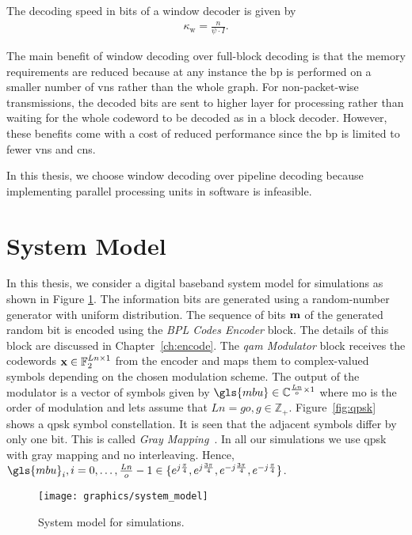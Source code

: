 The decoding speed in bits of a window decoder is given by
\begin{align}
\kappa_{\text{w}}=\frac{n}{\psi\cdot I}.
\end{align}

The main benefit of window decoding over full-block decoding is that the memory requirements are reduced because at any instance the \gls{bp} is performed on a smaller number of \glspl{vn} rather than the whole graph. For non-packet-wise transmissions, the decoded bits are sent to higher layer for processing rather than waiting for the whole codeword to be decoded as in a block decoder. However, these benefits come with a cost of reduced performance since the \gls{bp} is limited to fewer \glspl{vn} and \glspl{cn}.

In this thesis, we choose window decoding over pipeline decoding because implementing parallel processing units in software is infeasible.

\section{System Model}\label{sec:sys_mod}
In this thesis, we consider a digital baseband system model for simulations as shown in Figure \ref{fig:system}. The information bits are generated using a random-number generator with uniform distribution. The sequence of bits $\mathbf{m}$ of the generated random bit is encoded using the \emph{BPL Codes Encoder} block. The details of this block are discussed in Chapter~\ref{ch:encode}. The \emph{\gls{qam} Modulator} block receives the codewords $\mathbf{x}\in\mathbb{F}_2^{Ln\times 1}$ from the encoder and maps them to complex-valued symbols depending on the chosen modulation scheme. The output of the modulator is a vector of symbols given by $\gls{mbu}\in\mathbb{C}^{\frac{Ln}{o}\times 1}$ where \gls{mo} is the order of modulation and lets assume that $Ln=go, g\in\mathbb{Z}_+$. Figure~\ref{fig:qpsk} shows a \gls{qpsk} symbol constellation. It is seen that the adjacent symbols differ by only one bit. This is called \emph{Gray Mapping}~\cite{proak}. In all our simulations we use \gls{qpsk} with gray mapping and no interleaving. Hence, $\gls{mbu}_i,i=0,\dots,\frac{Ln}{o}-1\in\{e^{j\frac{\pi}{4}},e^{j\frac{3\pi}{4}},e^{-j\frac{3\pi}{4}},e^{-j\frac{\pi}{4}}\}$.
\begin{figure}[htbp]
  \centering
  \texttt{[image: graphics/system\_model]}
  \caption{System model for simulations.}
  \label{fig:system}
\end{figure}

